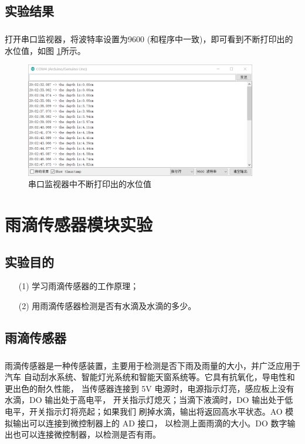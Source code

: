 \documentclass[UTF8, oneside]{ctexbook}
\begin{document}
\section{实验结果}
\paragraph{}
打开串口监视器，将波特率设置为9600 (和程序中一致)，即可看到不断打印出的水位值，如图
\ref{s15_1}所示。

\begin{figure}[h]
    \centering
    \includegraphics[width=0.9\textwidth]{./result/sensor/15/result.png}
    \caption{串口监视器中不断打印出的水位值}
    \label{s15_1}
\end{figure}




\chapter{雨滴传感器模块实验}

\section{实验目的}
\begin{itemize}
    \item[(1)] 学习雨滴传感器的工作原理；
    \item[(2)] 用雨滴传感器检测是否有水滴及水滴的多少。 
\end{itemize}

\section{雨滴传感器}
\paragraph{}
雨滴传感器是一种传感装置，主要用于检测是否下雨及雨量的大小，并广泛应用于汽车
自动刮水系统、智能灯光系统和智能天窗系统等。它具有抗氧化，导电性和更出色的耐久性能，
当传感器连接到 5V 电源时，电源指示灯亮，感应板上没有水滴，DO 输出处于高电平，
开关指示灯熄灭；当滴下液滴时，DO 输出处于低电平，开关指示灯将亮起；如果我们
刷掉水滴，输出将返回高水平状态。AO 模拟输出可以连接到微控制器上的 AD 接口，
以检测上面雨滴的大小。DO 数字输出也可以连接微控制器，以检测是否有雨。
\end{document}

